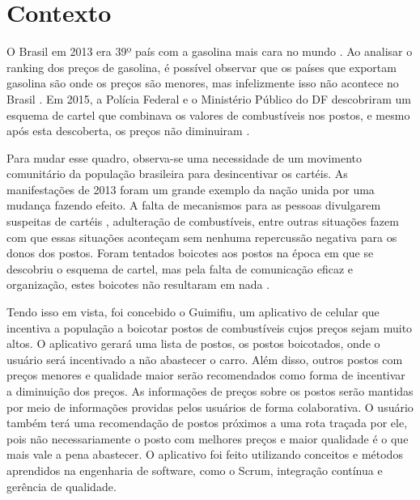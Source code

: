 \section{Contexto}
 
O Brasil em 2013 era 39º país com a gasolina mais cara no mundo \cite{oglobo}. Ao analisar o ranking dos preços de gasolina, é possível observar que os países que exportam gasolina são onde os preços são menores, mas infelizmente isso não acontece no Brasil \cite{ranking-precos}. Em 2015, a Polícia Federal e o Ministério Público do DF descobriram um esquema de cartel que combinava os valores de combustíveis nos postos, e mesmo após esta descoberta, os preços não diminuiram \cite{correio-cartel}. 

Para mudar esse quadro, observa-se uma necessidade de um movimento comunitário da população brasileira para desincentivar os cartéis. As manifestações de 2013 foram um grande exemplo da nação unida por uma mudança fazendo efeito. A falta de mecanismos para as pessoas divulgarem suspeitas de cartéis \cite{manifestacoes-2013}, adulteração de combustíveis, entre outras situações fazem com que essas situações aconteçam sem nenhuma repercussão negativa para os donos dos postos. Foram tentados boicotes aos postos na época em que se descobriu o esquema de cartel, mas pela falta de comunicação eficaz e organização, estes boicotes não resultaram em nada \cite{boicotes-2016}.

Tendo isso em vista, foi concebido o Guimifiu, um aplicativo de celular que incentiva a população a boicotar postos de combustíveis cujos preços sejam muito altos. O aplicativo gerará uma lista de postos, os postos boicotados, onde o usuário será incentivado a não abastecer o carro. Além disso, outros postos com preços menores e qualidade maior serão recomendados como forma de incentivar a diminuição dos preços. As informações de preços sobre os postos serão mantidas por meio de informações providas pelos usuários de forma colaborativa. O usuário também terá uma recomendação de postos próximos a uma rota traçada por ele, pois não necessariamente o posto com melhores preços e maior qualidade é o que mais vale a pena abastecer. O aplicativo foi feito utilizando conceitos e métodos aprendidos na engenharia de software, como o Scrum, integração contínua e gerência de qualidade.
